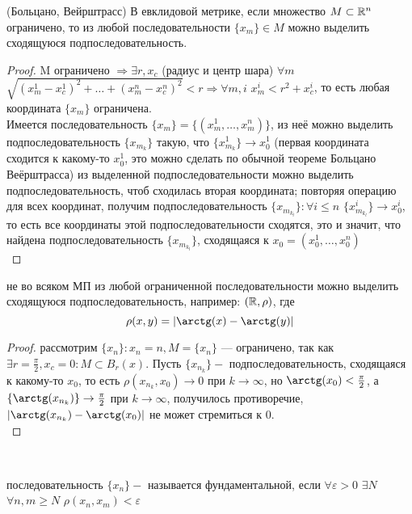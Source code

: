 \begin{theorem}
	(Больцано, Вейрштрасс) В евклидовой метрике, если множество $M \subset \mathbb{R}^n$ ограничено, то из любой последовательности $\{ x_m \} \in M$ можно выделить сходящуюся подпоследовательность.\\
	\begin{proof}
		M ограничено $\Rightarrow \exists r, x_c$ (радиус и центр шара) $\forall m$ $ \sqrt{(x_m^1 - x_c^1)^2 + \ldots + (x_m^n - x_c^n)^2} < r \Rightarrow \forall m, i$ $x_m^i < r^2 + x_c^i$, то есть любая координата $\{ x_m \}$ ограничена. \\
		Имеется последовательность $\{ x_m \} = \{ (x_m^1, \ldots, x_m^n) \}$, из неё можно выделить подпоследовательность $\{ x_{m_k} \}$ такую, что $ \{ x_{m_k}^1 \} \to x_0^1$ (первая координата сходится к какому-то $x_0^1$, это можно сделать по обычной теореме Больцано Веёрштрасса) из выделенной подпоследовательности можно выделить подпоследовательность, чтоб сходилась вторая координата; повторяя операцию для всех координат, получим подпоследовательность $\{ x_{m_{k_l}} \} : \forall i \le n$ $\{  x_{m_{k_l}}^i \} \to x_0^i$, то есть все координаты этой подпоследовательности сходятся, это и значит, что найдена подпоследовательность $\{ x_{m_{k_l}} \}$, сходящаяся к $x_0 = (x_0^1, \ldots, x_0^n)$
\\
	\end{proof}
\end{theorem}

\begin{remark}
	не во всяком МП из любой ограниченной последовательности можно выделить сходящуюся подпоследовательность, например: $(\mathbb{R}, \rho)$, где
	\[ \rho(x, y) = |\arctg(x) - \arctg(y)| \]
	\begin{proof}
	рассмотрим $ \{x_n \} : x_n = n , M = \{ x_n \}$ — ограничено, так как $\exists r = \frac{\pi}{2}, x_c = 0 : M \subset B_r(x)$. Пусть $\{x_{n_k}\} -$ подпоследовательность, сходящаяся к какому-то $x_0$, то есть $\rho(x_{n_k}, x_0) \to 0$ при $k \to \infty$, но $\arctg(x_0) < \frac{\pi}{2}$, а $\{\arctg(x_{n_k})\} \to \frac{\pi}{2}$ при $k \to \infty$, получилось противоречие, $|\arctg(x_{n_k}) - \arctg(x_0)|$ не может стремиться к 0.\\
	\end{proof} \\
\end{remark}

\begin{definition}
	последовательность $\{ x_n \} - $ называется фундаментальной, если $\forall \varepsilon > 0$ $\exists N$ $\forall n, m \ge N$ $\rho(x_n, x_m) < \varepsilon$
\end{definition}

